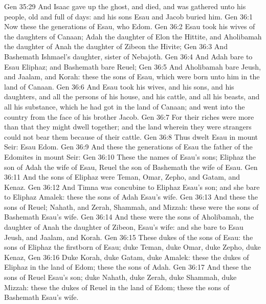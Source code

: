 \vs Gen 35:29 And Isaac gave up the ghost, and died, and was gathered unto his people,  old and full of days: and his sons Esau and Jacob buried him.
\vs Gen 36:1 Now these  the generations of Esau, who  Edom.
\vs Gen 36:2 Esau took his wives of the daughters of Canaan; Adah the daughter of Elon the Hittite, and Aholibamah the daughter of Anah the daughter of Zibeon the Hivite;
\vs Gen 36:3 And Bashemath Ishmael's daughter, sister of Nebajoth.
\vs Gen 36:4 And Adah bare to Esau Eliphaz; and Bashemath bare Reuel;
\vs Gen 36:5 And Aholibamah bare Jeush, and Jaalam, and Korah: these  the sons of Esau, which were born unto him in the land of Canaan.
\vs Gen 36:6 And Esau took his wives, and his sons, and his daughters, and all the persons of his house, and his cattle, and all his beasts, and all his substance, which he had got in the land of Canaan; and went into the country from the face of his brother Jacob.
\vs Gen 36:7 For their riches were more than that they might dwell together; and the land wherein they were strangers could not bear them because of their cattle.
\vs Gen 36:8 Thus dwelt Esau in mount Seir: Esau  Edom.
\vs Gen 36:9 And these  the generations of Esau the father of the Edomites in mount Seir:
\vs Gen 36:10 These  the names of Esau's sons; Eliphaz the son of Adah the wife of Esau, Reuel the son of Bashemath the wife of Esau.
\vs Gen 36:11 And the sons of Eliphaz were Teman, Omar, Zepho, and Gatam, and Kenaz.
\vs Gen 36:12 And Timna was concubine to Eliphaz Esau's son; and she bare to Eliphaz Amalek: these  the sons of Adah Esau's wife.
\vs Gen 36:13 And these  the sons of Reuel; Nahath, and Zerah, Shammah, and Mizzah: these were the sons of Bashemath Esau's wife.
\vs Gen 36:14 And these were the sons of Aholibamah, the daughter of Anah the daughter of Zibeon, Esau's wife: and she bare to Esau Jeush, and Jaalam, and Korah.
\vs Gen 36:15 These  dukes of the sons of Esau: the sons of Eliphaz the firstborn  of Esau; duke Teman, duke Omar, duke Zepho, duke Kenaz,
\vs Gen 36:16 Duke Korah, duke Gatam,  duke Amalek: these  the dukes  of Eliphaz in the land of Edom; these  the sons of Adah.
\vs Gen 36:17 And these  the sons of Reuel Esau's son; duke Nahath, duke Zerah, duke Shammah, duke Mizzah: these  the dukes  of Reuel in the land of Edom; these  the sons of Bashemath Esau's wife.
